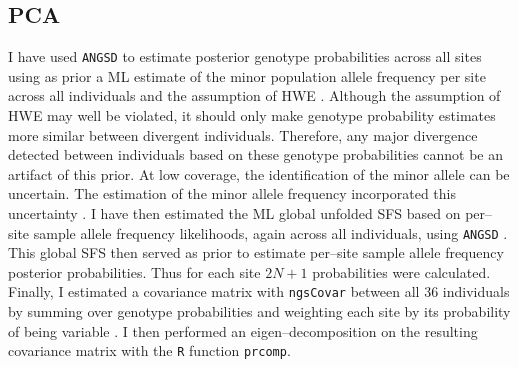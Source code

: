 \documentclass[a4paper,12pt,times,authoryear,twoside,print,index]{Classes/PhDThesisPSnPDF}\usepackage[]{graphicx}\usepackage[]{color}
\begin{document}
\subsection{PCA}
%
%
I have used \texttt{ANGSD}  \citep{Korneliussen2014} to estimate posterior genotype probabilities across all sites using as prior a \gls{ML} estimate of the minor \gls{population allele frequency} per site across all individuals and the assumption of \gls{HWE} \citep{Kim2011}. Although the assumption of \gls{HWE} may well be violated, it should only make genotype probability estimates more similar between divergent individuals. Therefore, any major divergence detected between individuals based on these genotype probabilities cannot be an artifact of this prior. At low coverage, the identification of the minor allele can be uncertain. The estimation of the minor allele frequency incorporated this uncertainty \cite[suppl. mat.]{Skotte2012}. I have then estimated the \gls{ML} global unfolded \gls{SFS} based on per--site \gls{sample allele frequency} likelihoods, again across all individuals, using \texttt{ANGSD} \citep{Nielsen2012, Korneliussen2013}. This global \gls{SFS} then served as prior to estimate per--site \gls{sample allele frequency} posterior probabilities. Thus for each site $2N+1$ probabilities were calculated. Finally, I estimated a covariance matrix with \texttt{ngsCovar} \citep{Fumagalli2014} between all 36 individuals by summing over genotype probabilities and weighting each site by its probability of being variable \citep[eq. 19 and 20]{Fumagalli2013}. I then performed an eigen--decomposition on the resulting covariance matrix with the \texttt{R} function \texttt{prcomp}.
%
%
\end{document}

